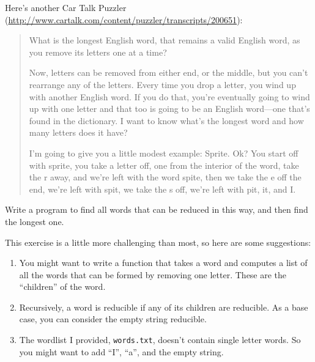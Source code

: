 \documentclass[10pt]{book}
\begin{document}
\begin{CJK}{UTF8}{gbsn}
\begin{exercise}
\end{exercise}



\begin{exercise}

Here's another Car Talk Puzzler
(\url{http://www.cartalk.com/content/puzzler/transcripts/200651}):

\begin{quote}
What is the longest English word, that remains a valid English word,
as you remove its letters one at a time?

Now, letters can be removed from either end, or the middle, but you
can't rearrange any of the letters. Every time you drop a letter, you
wind up with another English word. If you do that, you're eventually
going to wind up with one letter and that too is going to be an
English word---one that's found in the dictionary. I want to know
what's the longest word and how many letters does it
have?

I'm going to give you a little modest example: Sprite. Ok? You start
off with sprite, you take a letter off, one from the interior of the
word, take the r away, and we're left with the word spite, then we
take the e off the end, we're left with spit, we take the s off, we're
left with pit, it, and I.
\end{quote}

Write a program to find all words that can be reduced in this way,
and then find the longest one.

This exercise is a little more challenging than most, so here are
some suggestions:

\begin{enumerate}

\item You might want to write a function that takes a word and
  computes a list of all the words that can be formed by removing one
  letter.  These are the ``children'' of the word.

\item Recursively, a word is reducible if any of its children
are reducible.  As a base case, you can consider the empty
string reducible.

\item The wordlist I provided, {\tt words.txt}, doesn't
contain single letter words.  So you might want to add
``I'', ``a'', and the empty string.


\end{enumerate}
\end{exercise}
\end{CJK}
\end{document}
